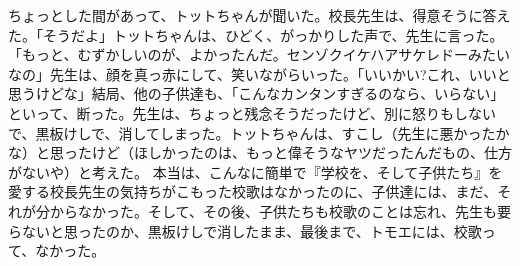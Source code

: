 \documentclass[12pt,a4paper,oneside,openany]{book}
\begin{document}
ちょっとした間があって、トットちゃんが聞いた。校長先生は、得意そうに答えた。「そうだよ」トットちゃんは、ひどく、がっかりした声で、先生に言った。「もっと、むずかしいのが、よかったんだ。センゾクイケハアサケレドーみたいなの」先生は、顔を真っ赤にして、笑いながらいった。「いいかい?これ、いいと思うけどな」結局、他の子供達も、「こんなカンタンすぎるのなら、いらない」といって、断った。先生は、ちょっと残念そうだったけど、別に怒りもしないで、黒板けしで、消してしまった。トットちゃんは、すこし（先生に悪かったかな）と思ったけど（ほしかったのは、もっと偉そうなヤツだったんだもの、仕方がないや）と考えた。
本当は、こんなに簡単で『学校を、そして子供たち』を愛する校長先生の気持ちがこもった校歌はなかったのに、子供達には、まだ、それが分からなかった。そして、その後、子供たちも校歌のことは忘れ、先生も要らないと思ったのか、黒板けしで消したまま、最後まで、トモエには、校歌って、なかった。
\end{document}
